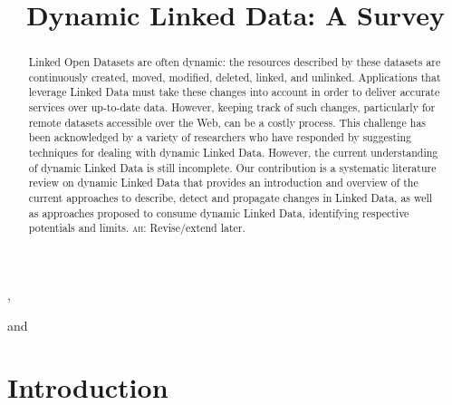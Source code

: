 \documentclass[sw]{iosart2x}
\newcommand{\ah}[1]{{\color{blue!70!black}\textsc{ah:} #1}}
\begin{document}
\begin{frontmatter}

\title{Dynamic Linked Data: A Survey}

\author[A]{ },
\author[B]{ }
and
\author[A]{ }
\address[A]{IMFD Chile; Department of Computer Science, , }
\address[B]{,
Southampton, }

\begin{abstract}
Linked Open Datasets are often dynamic: the resources described by these datasets are continuously created, moved, modified, deleted, linked, and unlinked. Applications that leverage Linked Data must take these changes into account in order to deliver accurate services over up-to-date data. However, keeping track of such changes, particularly for remote datasets accessible over the Web, can be a costly process. This challenge has been acknowledged by a variety of researchers who have responded by suggesting techniques for dealing with dynamic Linked Data. However, the current understanding of dynamic Linked Data is still incomplete. Our contribution is a systematic literature review on dynamic Linked Data that provides an introduction and overview of the current approaches to describe, detect and propagate changes in Linked Data, as well as approaches proposed to consume dynamic Linked Data, identifying respective potentials and limits. \ah{Revise/extend later.}
\end{abstract}

\begin{keyword}
\end{keyword}

\end{frontmatter}


\section{Introduction}\label{Introduction}
\end{document}
